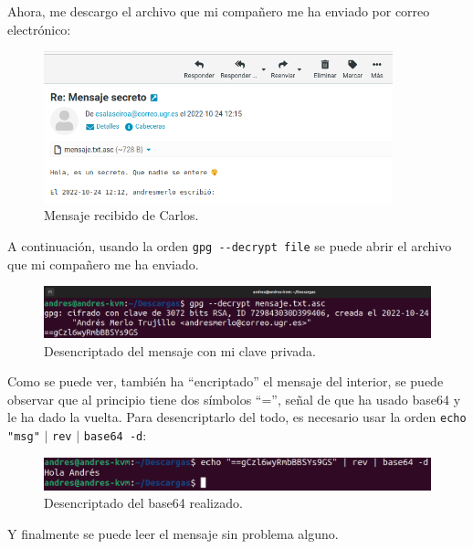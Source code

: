 \documentclass{article}
\begin{document}
Ahora, me descargo el archivo que mi compañero me ha enviado por correo electrónico:

\begin{figure}[H]
    \includegraphics[width=0.9\textwidth]{imagenes/Portatil/Captura desde 2022-10-24 12-16-48.png}
    \caption{Mensaje recibido de Carlos.}
\end{figure}

A continuación, usando la orden \verb|gpg --decrypt file| se puede abrir el archivo que mi compañero me ha enviado.

\begin{figure}[H]
    \includegraphics[width=\textwidth]{imagenes/Portatil/Captura desde 2022-10-24 12-18-40.png}
    \caption{Desencriptado del mensaje con mi clave privada.}
\end{figure}

Como se puede ver, también ha ``encriptado'' el mensaje del interior, se puede observar que al principio tiene dos símbolos ``='', señal de que ha usado base64 y le ha dado la vuelta. Para desencriptarlo del todo, es necesario usar la orden \verb|echo "msg"| $\vert$ \verb|rev| $\vert$ \verb|base64 -d|:

\begin{figure}[H]
    \includegraphics[width=\textwidth]{imagenes/Portatil/base64.png}
    \caption{Desencriptado del base64 realizado.}
\end{figure}

Y finalmente se puede leer el mensaje sin problema alguno.

\newpage

{}
\end{document}
